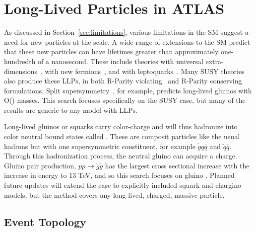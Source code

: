 \chapter{Long-Lived Particles in ATLAS}

\label{ch:simulation}

As discussed in Section~\ref{sec:limitations}, various limitations in the \ac{SM} suggest a need for new particles at the \TeV scale. 
A wide range of extensions to the \acl{SM} predict that these new particles can have lifetimes greater than approximately one-hundredth of a nanosecond.
These include theories with universal extra-dimensions~\cite{extra_dim1, extra_dim2}, with new fermions~\cite{newfermions}, and with leptoquarks~\cite{leptoquark}.
Many \ac{SUSY} theories also produce these \acp{LLP}, in both R-Parity violating~\cite{rpv1, rpv2, rpv3} and R-Parity conserving~\cite{rpc1, rpc2, rpc3, rpc4} formulations.
Split supersymmetry~\cite{split1, split2}, for example, predicts long-lived gluinos with O(\TeV) masses.
This search focuses specifically on the \ac{SUSY} case, but many of the results are generic to any model with \acp{LLP}. 

Long-lived gluinos or squarks carry color-charge and will thus hadronize into color neutral bound states called \rhadrons.
These are composit particles like the usual hadrons but with one supersymmetric constituent, for example $\tilde{g}q\bar{q}$ and $\tilde{q}\bar{q}$.
Through this hadronization process, the neutral gluino can acquire a charge.
Gluino pair production, $p p\rightarrow \tilde{g}\tilde{g}$ has the largest cross sectional increase with the increase in energy to 13 TeV, and so this search focuses on gluino \rhadrons.
Planned future updates will extend the case to explicitly included squark and chargino models, but the method covers any long-lived, charged, massive particle.

\section{Event Topology}
\label{sec:characteristics}


